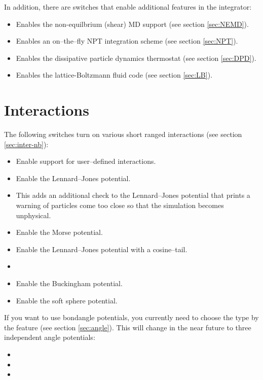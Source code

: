 In addition, there are switches that enable additional features in the
integrator:
\begin{itemize}
\item {} Enables the non-equilbrium (shear) MD support
  (see section \vref{sec:NEMD}).
\item {} Enables an on--the--fly NPT integration scheme
  (see section \vref{sec:NPT}).
\item {} Enables the dissipative particle dynamics
  thermostat (see section \vref{sec:DPD}).
\item {} Enables the lattice-Boltzmann fluid code (see
  section \vref{sec:LB}).
\end{itemize}

\section{Interactions}

The following switches turn on various short ranged interactions (see section
\vref{sec:inter-nb}):
\begin{itemize}
\item {} Enable support for user--defined
  interactions.
\item {} Enable the Lennard--Jones potential.
\item {} This adds an additional check to
  the Lennard--Jones potential that prints a warning of particles come
  too close so that the simulation becomes unphysical.
\item {} Enable the Morse potential.
\item {} Enable the Lennard--Jones potential with a cosine--tail.
\item {}
\item {} Enable the Buckingham potential.
\item {} Enable the soft sphere potential.
\end{itemize}

If you want to use bondangle potentials, you currently need to choose
the type by the feature (see section \vref{sec:angle}). This will
change in the near future to three independent angle potentials:
\begin{itemize}
\item {}
\item {}
\item {}
\end{itemize}

